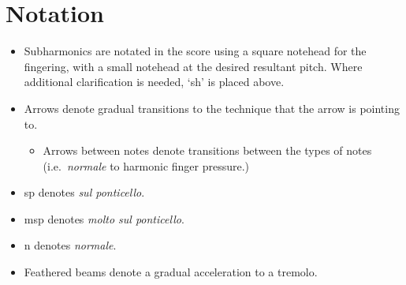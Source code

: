\section*{Notation}
\begin{itemize}

    \item Subharmonics are notated in the score using a square notehead for the fingering, with a small notehead at the desired resultant pitch. Where additional clarification is needed, `sh' is placed above.
    \item Arrows denote gradual transitions to the technique that the arrow is pointing to.\begin{itemize}
        \item Arrows between notes denote transitions between the types of notes (i.e.\ \emph{normale} to harmonic finger pressure.)
      \end{itemize}
    \item sp denotes \emph{sul ponticello}.
    \item msp denotes \emph{molto sul ponticello}.
    \item n denotes \emph{normale}.
    \item Feathered beams denote a gradual acceleration to a tremolo.
\end{itemize}

\newpage\label{app:violaPiece Score}

% 
